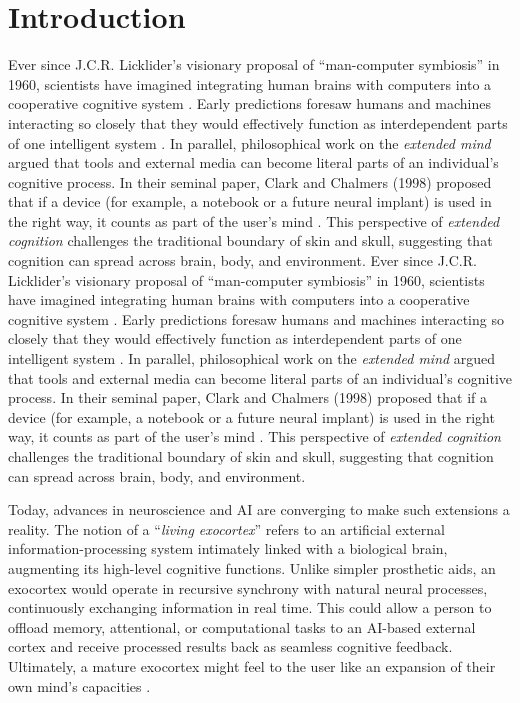 \documentclass[11pt]{article}
\newcommand{\quotes}[1]{``#1''}
\begin{document}
\section{Introduction}
Ever since J.C.R. Licklider's visionary proposal of \quotes{man-computer symbiosis} in 1960, scientists have imagined integrating human brains with computers into a cooperative cognitive system \cite{Licklider1960}. Early predictions foresaw humans and machines interacting so closely that they would effectively function as interdependent parts of one intelligent system \cite{Clark1998}. In parallel, philosophical work on the \textit{extended mind} argued that tools and external media can become literal parts of an individual's cognitive process. In their seminal paper, Clark and Chalmers (1998) proposed that if a device (for example, a notebook or a future neural implant) is used in the right way, it counts as part of the user's mind \cite{Clark1998}. This perspective of \textit{extended cognition} challenges the traditional boundary of skin and skull, suggesting that cognition can spread across brain, body, and environment.
Ever since J.C.R. Licklider's visionary proposal of \quotes{man-computer symbiosis} in 1960, scientists have imagined integrating human brains with computers into a cooperative cognitive system \cite{Licklider1960}. Early predictions foresaw humans and machines interacting so closely that they would effectively function as interdependent parts of one intelligent system \cite{Clark1998}. In parallel, philosophical work on the \textit{extended mind} argued that tools and external media can become literal parts of an individual's cognitive process. In their seminal paper, Clark and Chalmers (1998) proposed that if a device (for example, a notebook or a future neural implant) is used in the right way, it counts as part of the user's mind \cite{Clark1998}. This perspective of \textit{extended cognition} challenges the traditional boundary of skin and skull, suggesting that cognition can spread across brain, body, and environment.

Today, advances in neuroscience and AI are converging to make such extensions a reality. The notion of a \quotes{\textit{living exocortex}} refers to an artificial external information-processing system intimately linked with a biological brain, augmenting its high-level cognitive functions. Unlike simpler prosthetic aids, an exocortex would operate in recursive synchrony with natural neural processes, continuously exchanging information in real time. This could allow a person to offload memory, attentional, or computational tasks to an AI-based external cortex and receive processed results back as seamless cognitive feedback. Ultimately, a mature exocortex might feel to the user like an expansion of their own mind's capacities \cite{Yager2024}.
\end{document}

